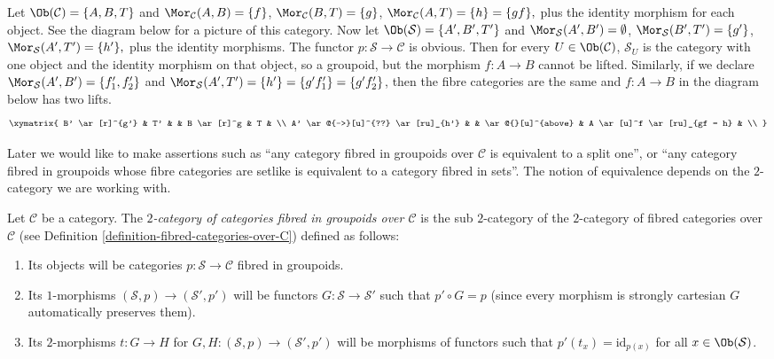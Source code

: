 \begin{example}
\label{example-not-fibred-in-groupoids-but-fibre-cats-are}
Let $\Ob(\mathcal{C}) = \{A, B, T\}$ and
$\Mor_\mathcal{C}(A, B) = \{f\}$, $\Mor_\mathcal{C}(B, T) = \{g\}$,
$\Mor_\mathcal{C}(A, T) = \{h\} = \{gf\}, $ plus the identity morphism
for each object. See the diagram below for a picture of this category. Now let
$\Ob(\mathcal{S}) = \{A', B', T'\}$ and
$\Mor_\mathcal{S}(A', B') = \emptyset$,
$\Mor_\mathcal{S}(B', T') = \{g'\}$,
$\Mor_\mathcal{S}(A', T') = \{h'\}, $ plus the identity morphisms. The
functor $p : \mathcal{S} \to \mathcal{C}$ is obvious. Then for every
$U \in \Ob(\mathcal{C})$, $\mathcal{S}_U$ is the category with one
object and the identity morphism on that object, so a groupoid, but the
morphism $f: A \to B$ cannot be lifted. Similarly, if we declare
$\Mor_\mathcal{S}(A', B') = \{f'_1, f'_2\}$ and
$ \Mor_\mathcal{S}(A', T') = \{h'\} = \{g'f'_1 \} = \{g'f'_2\}$, then
the fibre categories are the same and $f: A \to B$ in the diagram below has
two lifts.
$$
\xymatrix{
B' \ar[r]^{g'} & T' &  & B \ar[r]^g & T & \\
A' \ar@{-->}[u]^{??} \ar[ru]_{h'} & & \ar@{}[u]^{above} &
A \ar[u]^f \ar[ru]_{gf = h} & \\
}
$$
\end{example}

\noindent
Later we would like to make assertions such as ``any category fibred in
groupoids over $\mathcal{C}$ is equivalent to a split one'', or
``any category fibred in groupoids whose fibre categories are setlike
is equivalent to a category fibred in sets''. The notion of equivalence
depends on the $2$-category we are working with.

\begin{definition}
\label{definition-categories-fibred-in-groupoids-over-C}
Let $\mathcal{C}$ be a category.
The {\it $2$-category of categories fibred in groupoids over $\mathcal{C}$}
is the sub $2$-category of the $2$-category of fibred categories
over $\mathcal{C}$ (see Definition \ref{definition-fibred-categories-over-C})
defined as follows:
\begin{enumerate}
\item Its objects will be categories
$p : \mathcal{S} \to \mathcal{C}$ fibred in groupoids.
\item Its $1$-morphisms $(\mathcal{S}, p) \to (\mathcal{S}', p')$
will be functors $G : \mathcal{S} \to \mathcal{S}'$ such that
$p' \circ G = p$ (since every morphism is strongly cartesian
$G$ automatically preserves them).
\item Its $2$-morphisms $t : G \to H$ for
$G, H : (\mathcal{S}, p) \to (\mathcal{S}', p')$
will be morphisms of functors
such that $p'(t_x) = \text{id}_{p(x)}$
for all $x \in \Ob(\mathcal{S})$.
\end{enumerate}
\end{definition}

